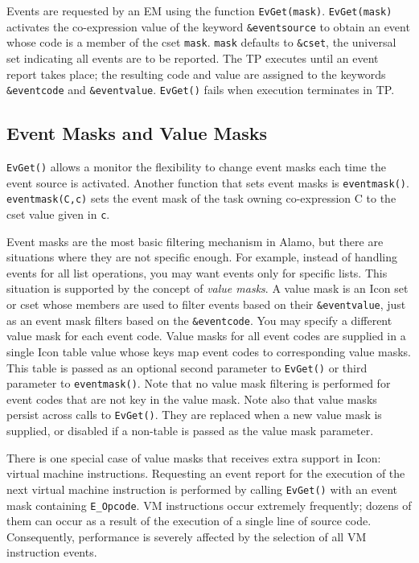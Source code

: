 Events are requested by an EM using the function {\tt EvGet(mask)}.
{\tt EvGet(mask)} activates the co-expression value of the keyword 
{\tt \&eventsource} to obtain an event whose code is a member of the
cset {\tt mask}.
{\tt mask} defaults to {\tt \&cset}, the universal set indicating all events
are to be reported.
The TP executes until an event report takes place; the resulting code and
value are assigned to the keywords {\tt \&eventcode} and {\tt \&eventvalue}.
{\tt EvGet()} fails when execution terminates in TP.

\subsection*{Event Masks and Value Masks}

{\tt EvGet()} allows a monitor the flexibility to change event masks each
time the event source is activated.  Another function that sets event masks
is {\tt eventmask()}.  {\tt eventmask(C,c)} sets the event mask of the task
owning co-expression C to the cset value given in {\tt c}.

Event masks are the most basic filtering mechanism in Alamo, but there are
situations where they are not specific enough.  For example, instead of
handling events for all list operations, you may want events only for
specific lists.  This situation is supported by the concept of {\em value
masks}.  A value mask is an Icon set or cset whose members are used to
filter events based on their {\tt \&eventvalue}, just as an event mask
filters based on the {\tt \&eventcode}.  You may specify a different value
mask for each event code.  Value masks for all event codes are supplied in a
single Icon table value whose keys map event codes to corresponding value
masks.  This table is passed as an optional second parameter to {\tt EvGet()}
or third parameter to {\tt eventmask()}.  Note that no value mask filtering
is performed for event codes that are not key in the value mask.  Note also
that value masks persist across calls to {\tt EvGet()}. They are replaced
when a new value mask is supplied, or disabled if a non-table is
passed as the value mask parameter.

There is one special case of value masks that receives extra support in
Icon: virtual machine instructions.
Requesting an event report for the execution of the next virtual
machine instruction is performed by calling {\tt EvGet()} with an event
mask containing {\tt E\_Opcode}.  VM instructions occur
extremely frequently; dozens of them can occur as a result of the
execution of a single line of source code.  Consequently, performance
is severely affected by the selection of all VM instruction events.

